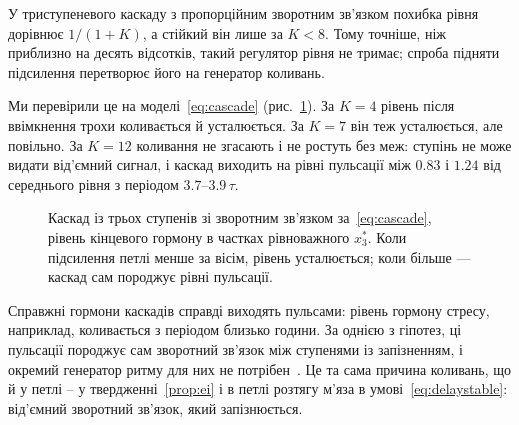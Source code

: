 \begin{keyblock}
\begin{proposition}
\label{prop:cascade}
У триступеневого каскаду з пропорційним зворотним зв'язком похибка рівня дорівнює $1/(1+K)$, а стійкий він лише за $K<8$. Тому точніше, ніж приблизно на десять відсотків, такий регулятор рівня не тримає; спроба підняти підсилення перетворює його на генератор коливань.
\end{proposition}
\end{keyblock}

Ми перевірили це на моделі~\eqref{eq:cascade} (рис.~\ref{fig:cascade}). За $K=4$ рівень після ввімкнення трохи коливається й усталюється. За $K=7$ він теж усталюється, але повільно. За $K=12$ коливання не згасають і не ростуть без меж: ступінь не може видати від'ємний сигнал, і каскад виходить на рівні пульсації між $0.83$ і $1.24$ від середнього рівня з періодом $3.7$--$3.9\,\tau$.

\begin{figure}[t]
\centering
{}
\caption{Каскад із трьох ступенів зі зворотним зв'язком за~\eqref{eq:cascade}, рівень кінцевого гормону в частках рівноважного $x_3^*$. Коли підсилення петлі менше за вісім, рівень усталюється; коли більше --- каскад сам породжує рівні пульсації.}
\label{fig:cascade}
\end{figure}

Справжні гормони каскадів справді виходять пульсами: рівень гормону стресу, наприклад, коливається з періодом близько години. За однією з гіпотез, ці пульсації породжує сам зворотний зв'язок між ступенями із запізненням, і окремий генератор ритму для них не потрібен~\cite{Walker2010}. Це та сама причина коливань, що й у петлі -- у твердженні~\ref{prop:ei} і в петлі розтягу м'яза в умові~\eqref{eq:delaystable}: від'ємний зворотний зв'язок, який запізнюється.

